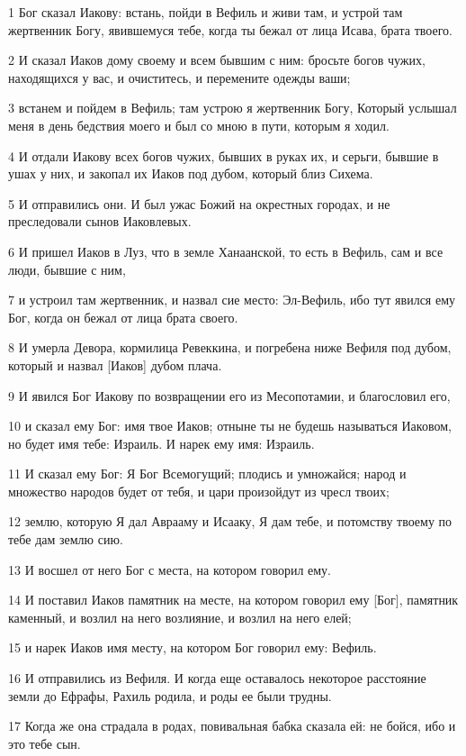 \par 1 Бог сказал Иакову: встань, пойди в Вефиль и живи там, и устрой там жертвенник Богу, явившемуся тебе, когда ты бежал от лица Исава, брата твоего.
\par 2 И сказал Иаков дому своему и всем бывшим с ним: бросьте богов чужих, находящихся у вас, и очиститесь, и перемените одежды ваши;
\par 3 встанем и пойдем в Вефиль; там устрою я жертвенник Богу, Который услышал меня в день бедствия моего и был со мною в пути, которым я ходил.
\par 4 И отдали Иакову всех богов чужих, бывших в руках их, и серьги, бывшие в ушах у них, и закопал их Иаков под дубом, который близ Сихема.
\par 5 И отправились они. И был ужас Божий на окрестных городах, и не преследовали сынов Иаковлевых.
\par 6 И пришел Иаков в Луз, что в земле Ханаанской, то есть в Вефиль, сам и все люди, бывшие с ним,
\par 7 и устроил там жертвенник, и назвал сие место: Эл-Вефиль, ибо тут явился ему Бог, когда он бежал от лица брата своего.
\par 8 И умерла Девора, кормилица Ревеккина, и погребена ниже Вефиля под дубом, который и назвал [Иаков] дубом плача.
\par 9 И явился Бог Иакову по возвращении его из Месопотамии, и благословил его,
\par 10 и сказал ему Бог: имя твое Иаков; отныне ты не будешь называться Иаковом, но будет имя тебе: Израиль. И нарек ему имя: Израиль.
\par 11 И сказал ему Бог: Я Бог Всемогущий; плодись и умножайся; народ и множество народов будет от тебя, и цари произойдут из чресл твоих;
\par 12 землю, которую Я дал Аврааму и Исааку, Я дам тебе, и потомству твоему по тебе дам землю сию.
\par 13 И восшел от него Бог с места, на котором говорил ему.
\par 14 И поставил Иаков памятник на месте, на котором говорил ему [Бог], памятник каменный, и возлил на него возлияние, и возлил на него елей;
\par 15 и нарек Иаков имя месту, на котором Бог говорил ему: Вефиль.
\par 16 И отправились из Вефиля. И когда еще оставалось некоторое расстояние земли до Ефрафы, Рахиль родила, и роды ее были трудны.
\par 17 Когда же она страдала в родах, повивальная бабка сказала ей: не бойся, ибо и это тебе сын.
